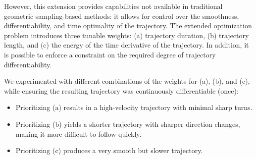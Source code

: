 However, this extension provides capabilities not available in traditional geometric sampling-based methods: it allows for control over the smoothness, differentiability, and time optimality of the trajectory. The extended optimization problem introduces three tunable weights: (a) trajectory duration, (b) trajectory length, and (c) the energy of the time derivative of the trajectory. In addition, it is possible to enforce a constraint on the required degree of trajectory differentiability.

We experimented with different combinations of the weights for (a), (b), and (c), while ensuring the resulting trajectory was continuously differentiable (once):

\begin{itemize}[leftmargin=*]
    \item Prioritizing (a) results in a high-velocity trajectory with minimal sharp turns.
    \item Prioritizing (b) yields a shorter trajectory with sharper direction changes, making it more difficult to follow quickly.
    \item Prioritizing (c) produces a very smooth but slower trajectory.
\end{itemize}